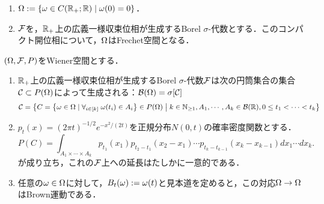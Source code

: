\documentclass[uplatex,dvipdfmx]{jsreport}
\begin{document}
\begin{definition}\mbox{}
    \begin{enumerate}
        \item $\Omega:=\left\{\omega\in C(\mathbb{R}_+;\mathbb{R})\mid\omega(0)=0\right\}$．
        \item $\mathcal{F}$を，$\mathbb{R}_+$上の広義一様収束位相が生成するBorel $\sigma$-代数とする．このコンパクト開位相について，$\Omega$はFrechet空間となる．
    \end{enumerate}
\end{definition}

\begin{proposition}[Wiener測度の構成]\label{prop-construction-of-Wiener-measure}
    $(\Omega,\mathcal{F},P)$をWiener空間とする．
    \begin{enumerate}
        \item $\mathbb{R}_+$上の広義一様収束位相が生成するBorel $\sigma$-代数$\mathcal{F}$は次の円筒集合の集合$\mathcal{C}\subset P(\Omega)$によって生成される：$\mathcal{B}(\Omega)=\sigma[\mathcal{C}]$
        \[\mathcal{C}=\left\{C=\left\{\omega\in\Omega\mid\forall_{i\in[k]}\;\omega(t_i)\in A_i\right\}\in P(\Omega)\;\middle|\;k\in\mathbb{N}_{\ge1},A_1,\cdots,A_k\in\mathcal{B}(\mathbb{R}),0\le t_1<\cdots<t_k\right\}\]
        \item $p_t(x)=(2\pi t)^{-1/2}e^{-x^2/(2t)}$を正規分布$N(0,t)$の確率密度関数とする．
        \[P(C)=\int_{A_1\times\cdots\times A_k}p_{t_1}(x_1)p_{t_2-t_1}(x_2-x_1)\cdots p_{t_k-t_{k-1}}(x_k-x_{k-1})dx_1\cdots dx_k.\]
        が成り立ち，これの$\mathcal{F}$上への延長はたしかに一意的である．
        \item 任意の$\omega\in\Omega$に対して，$B_t(\omega):=\omega(t)$と見本道を定めると，この対応$\Omega\to\Omega$はBrown運動である．
    \end{enumerate}
\end{proposition}
\end{document}
